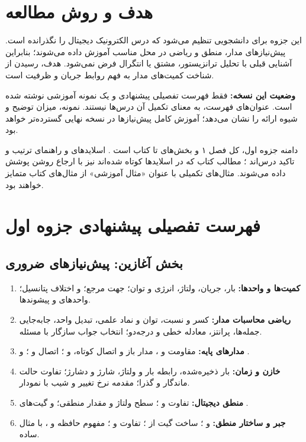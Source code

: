 \section*{هدف و روش مطالعه}
این جزوه برای دانشجویی تنظیم می‌شود که درس الکترونیک دیجیتال را نگذرانده است.
پیش‌نیازهای مدار، منطق و ریاضی در محل مناسب آموزش داده می‌شوند؛ بنابراین آشنایی قبلی
با تحلیل ترانزیستور، مشتق یا انتگرال فرض نمی‌شود. هدف، رسیدن از شناخت کمیت‌های مدار
به فهم روابط جریان و ظرفیت  است.

\textbf{وضعیت این نسخه:} فقط فهرست تفصیلی پیشنهادی و یک نمونه آموزشی نوشته شده است.
عنوان‌های فهرست، به معنای تکمیل آن درس‌ها نیستند. نمونه، میزان توضیح و شیوه ارائه را
نشان می‌دهد؛ آموزش کامل پیش‌نیازها در نسخه نهایی گسترده‌تر خواهد بود.

دامنه جزوه اول، کل فصل ۱ و بخش‌های  تا  کتاب است \cite{weste}.
اسلایدهای  و  راهنمای ترتیب و تاکید درس‌اند \cite{intro,mos}؛
مطالب کتاب که در اسلایدها کوتاه شده‌اند نیز با ارجاع روشن پوشش داده می‌شوند.
مثال‌های تکمیلی با عنوان «مثال آموزشی» از مثال‌های کتاب متمایز خواهند بود.

\section*{فهرست تفصیلی پیشنهادی جزوه اول}
\subsection*{بخش آغازین: پیش‌نیازهای ضروری}
\begin{enumerate}
\item \textbf{کمیت‌ها و واحدها:} بار، جریان، ولتاژ، انرژی و توان؛ جهت مرجع؛
 و اختلاف پتانسیل؛ واحدهای  و پیشوندها.
\item \textbf{ریاضی محاسبات مدار:} کسر و نسبت، توان و نماد علمی، تبدیل واحد،
جابه‌جایی جمله‌ها، پرانتز، معادله خطی و درجه‌دو؛ انتخاب جواب سازگار با مسئله.
\item \textbf{مدارهای پایه:} مقاومت و ، مدار باز و اتصال کوتاه،
 و ؛ اتصال  و ؛
 و .
\item \textbf{خازن و زمان:} بار ذخیره‌شده، رابطه بار و ولتاژ، شارژ و دشارژ؛
تفاوت حالت ماندگار و گذرا؛ مقدمه نرخ تغییر و شیب با نمودار.
\item \textbf{منطق دیجیتال:} تفاوت  و ؛
سطح ولتاژ و مقدار منطقی؛  و گیت‌های
.
\item \textbf{جبر و ساختار منطق:}  و ؛
ساخت گیت از ؛ تفاوت  و ؛
مفهوم حافظه و ، با مثال ساده.
\end{enumerate}

